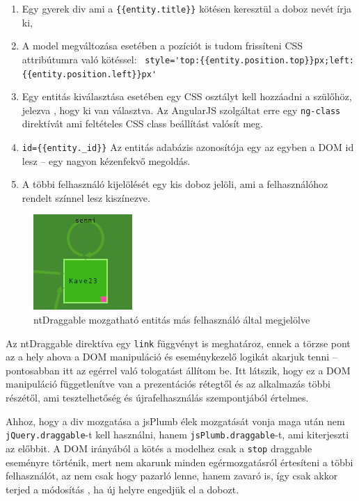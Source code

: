 \begin{enumerate}
\item Egy gyerek div ami a \lstinline|{{entity.title}}| kötésen keresztül a doboz nevét írja ki,
\item A model megváltozása esetében a pozíciót is tudom frissíteni CSS attribútumra való kötéssel: \lstinline| style='top:{{entity.position.top}}px;left:{{entity.position.left}}px'|
\item Egy entitás kiválasztása esetében egy CSS osztályt kell hozzáadni a szülőhöz, jelezva , hogy ki van választva. Az AngularJS szolgáltat erre egy \lstinline{ng-class} direktívát ami feltételes CSS class beállítást valósít meg. 
\item \lstinline|id={{entity._id}}| Az entitás adabázis azonosítója egy az egyben a DOM id lesz -- egy nagyon kézenfekvő megoldás.
\item A többi felhasználó kijelölését egy kis doboz jelöli, ami a felhasználóhoz rendelt színnel lesz kiszínezve.
\end{enumerate}

\begin{figure}[!ht]
\centering
\includegraphics[keepaspectratio]{figures/entitydirective.png}
\caption{ntDraggable mozgatható entitás más felhasználó által megjelölve}
\label{fig:entitydir}
\end{figure}

Az ntDraggable direktíva egy \lstinline{link} függvényt is meghatároz, ennek a törzse pont az a hely ahova a DOM manipuláció és eseménykezelő logikát akarjuk tenni -- pontosabban itt az egérrel való tologatást állítom be. Itt látszik, hogy ez a DOM manipuláció függetlenítve van a prezentációs rétegtől és az alkalmazás többi részétől, ami tesztelhetőség és újrafelhasználás szempontjából értelmes. 

Ahhoz, hogy a div mozgatása a jsPlumb élek mozgatását vonja maga után nem \lstinline{jQuery.draggable}-t kell használni, hanem \lstinline{jsPlumb.draggable}-t, ami kiterjeszti az előbbit. A DOM irányából a kötés a modelhez csak a \lstinline{stop} draggable eseményre történik, mert nem akarunk minden egérmozgatásról értesíteni a többi felhasználót, az nem csak hogy pazarló lenne, hanem zavaró is, így csak akkor terjed a módosítás , ha új helyre engedjük el a dobozt.

